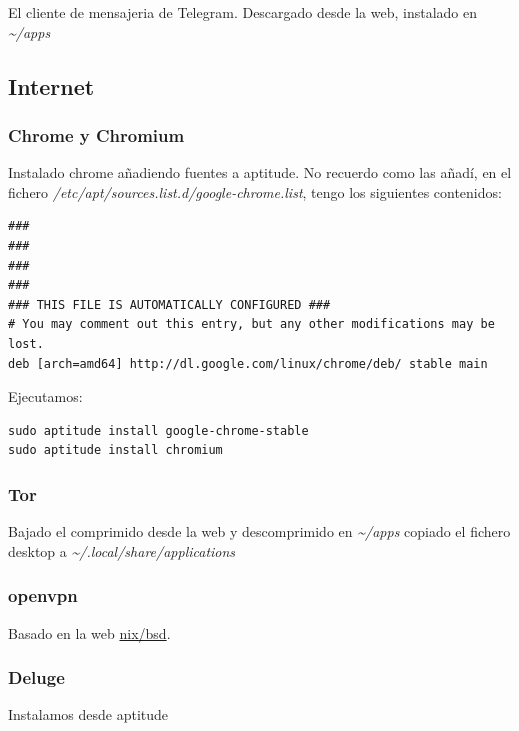 \documentclass[12pt,spanish,]{scrartcl}
\begin{document}
El cliente de mensajeria de Telegram. Descargado desde la web, instalado
en \emph{\textasciitilde{}/apps}

\subsection{Internet}\label{internet}

\subsubsection{Chrome y Chromium}\label{chrome-y-chromium}

Instalado chrome añadiendo fuentes a aptitude. No recuerdo como las
añadí, en el fichero \emph{/etc/apt/sources.list.d/google-chrome.list},
tengo los siguientes contenidos:

\begin{verbatim}
###
###
###
###
### THIS FILE IS AUTOMATICALLY CONFIGURED ###
# You may comment out this entry, but any other modifications may be lost.
deb [arch=amd64] http://dl.google.com/linux/chrome/deb/ stable main
\end{verbatim}

Ejecutamos:

\begin{verbatim}
sudo aptitude install google-chrome-stable
sudo aptitude install chromium
\end{verbatim}

\subsubsection{Tor}\label{tor}

Bajado el comprimido desde la web y descomprimido en
\emph{\textasciitilde{}/apps} copiado el fichero desktop a
\emph{\textasciitilde{}/.local/share/applications}

\subsubsection{openvpn}\label{openvpn}

Basado en la web
\href{https://nixbsd.wordpress.com/2017/04/01/freebsd-10-2-configure-openvpn-client/}{nix/bsd}.

\subsubsection{Deluge}\label{deluge}

Instalamos desde aptitude
\end{document}
